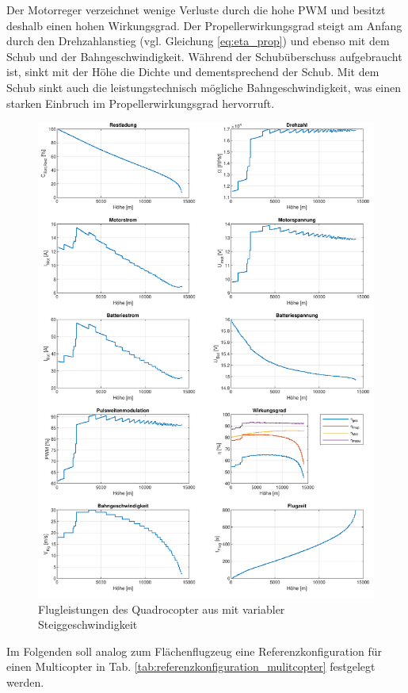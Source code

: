 Der Motorreger verzeichnet wenige Verluste durch die hohe PWM und besitzt deshalb einen hohen Wirkungsgrad. Der Propellerwirkungsgrad steigt am Anfang durch den Drehzahlanstieg (vgl. Gleichung \ref{eq:eta_prop}) und ebenso mit dem Schub und der Bahngeschwindigkeit. Während der Schubüberschuss aufgebraucht ist, sinkt mit der Höhe die Dichte und dementsprechend der Schub. Mit dem Schub sinkt auch die leistungstechnisch mögliche Bahngeschwindigkeit, was einen starken Einbruch im Propellerwirkungsgrad hervorruft.

\begin{figure}[H]
\centering
	\includegraphics[scale=0.7]{Diagramme/Russland_vvar.pdf}
	\caption{Flugleistungen des Quadrocopter aus \cite{Anderson.2018} mit variabler Steiggeschwindigkeit}
	\label{abb:russland_vvar}
\end{figure}

Im Folgenden soll analog zum Flächenflugzeug eine Referenzkonfiguration für einen Multicopter in Tab. \ref{tab:referenzkonfiguration_mulitcopter} festgelegt werden.

